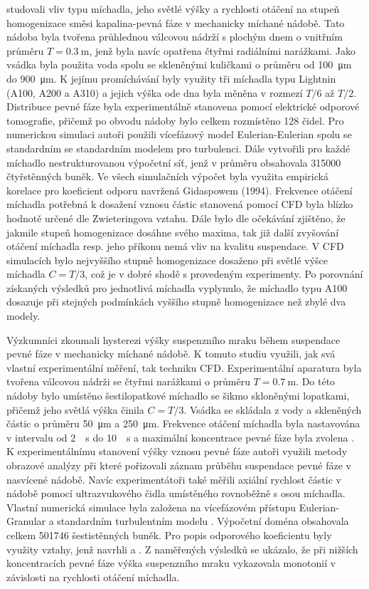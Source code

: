 \citet{hos10} studovali vliv typu míchadla, jeho světlé výšky a rychlosti otáčení na stupeň homogenizace směsi kapalina-pevná fáze v mechanicky míchané nádobě. Tato nádoba byla tvořena průhlednou válcovou nádrží s plochým dnem o vnitřním průměru $T=\SI{0.3}{\meter}$, jenž byla navíc opatřena čtyřmi radiálními narážkami. Jako vsádka byla použita voda spolu se skleněnými kuličkami o průměru od \SI{100}{\micro\meter} do \SI{900}{\micro\meter}. K jejímu promíchávání byly využity tři míchadla typu Lightnin (A100, A200 a A310) a jejich výška ode dna byla měněna v rozmezí $T/6$ až $T/2$. Distribuce pevné fáze byla experimentálně stanovena pomocí elektrické odporové tomografie, přičemž po obvodu nádoby bylo celkem rozmístěno \num{128} čidel. Pro numerickou simulaci autoři použili vícefázový model Eulerian-Eulerian spolu se standardním se standardním \keps{} modelem pro turbulenci. Dále vytvořili pro každé míchadlo nestrukturovanou výpočetní síť, jenž v průměru obsahovala \num{315000} čtyřstěnných buněk. Ve všech simulačních výpočet byla využita empirická korelace pro koeficient odporu navržená Gidaspowem (1994). Frekvence otáčení míchadla potřebná k dosažení vznosu částic stanovená pomocí CFD byla blízko hodnotě určené dle Zwieteringova vztahu. Dále bylo dle očekávání  zjištěno, že jakmile stupeň homogenizace dosáhne svého maxima, tak již další zvyšování otáčení míchadla resp. jeho příkonu nemá vliv na kvalitu suspendace. V CFD simulacích bylo nejvyššího stupně homogenizace dosaženo při světlé výšce míchadla $C=T/3$, což je v dobré shodě s provedeným experimenty. Po porovnání získaných výsledků pro jednotlivá míchadla vyplynulo, že míchadlo typu A100 dosazuje při stejných podmínkách vyššího stupně homogenizace než zbylé dva modely.

Výzkumníci \citet{sar10} zkoumali hysterezi výšky suspenzního mraku během suspendace pevné fáze v mechanicky míchané nádobě. K tomuto studiu využili, jak svá vlastní experimentální měření, tak techniku CFD. Experimentální aparatura byla tvořena válcovou nádrži se čtyřmi narážkami o průměru $T=\SI{0.7}{\meter}$. Do této nádoby bylo umístěno šestilopatkové míchadlo se šikmo skloněnými lopatkami, přičemž jeho světlá výška činila $C=T/3$. Vsádka se skládala z vody a skleněných částic o průměru \SI{50}{\micro\meter} a \SI{250}{\micro\meter}. Frekvence otáčení míchadla byla nastavována v intervalu od \SI{2}{\per\second} do \SI{10}{\per\second} a maximální koncentrace pevné fáze byla zvolena . K experimentálnímu stanovení výšky vznosu pevné fáze autoři využili metody obrazové analýzy při které pořizovali záznam průběhu suspendace pevné fáze v nasvícené nádobě. Navíc experimentátoři také měřili axiální rychlost částic v nádobě pomocí ultrazvukového čidla umístěného rovnoběžně s osou míchadla. Vlastní numerická simulace byla založena na vícefázovém přístupu Eulerian-Granular a standardním turbulentním modelu \keps{}. Výpočetní doména obsahovala celkem \num{501746} šestistěnných buněk. Pro popis odporového koeficientu byly využity vztahy, jenž navrhli \citet{bru98} a \citet{kho06}. Z naměřených výsledků se ukázalo, že při nižších koncentracích pevné fáze výška suspenzního mraku vykazovala monotonií v závislosti na rychlosti otáčení míchadla.  
